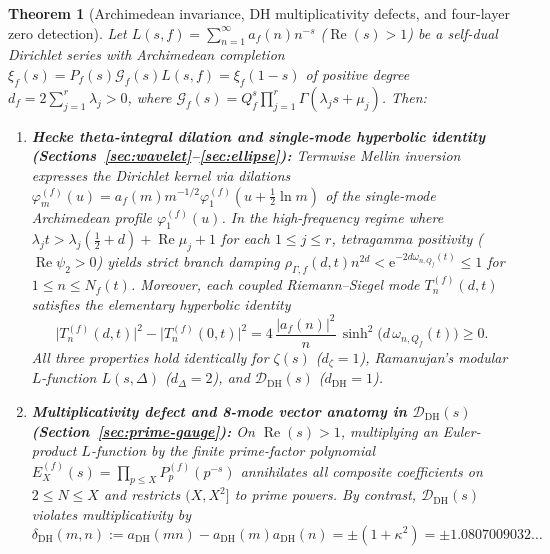 \documentclass[11pt,reqno]{amsart}
\newtheorem{theorem}{Theorem}[section]
\theoremstyle{definition}
\theoremstyle{remark}
\numberwithin{equation}{section}
\newcommand{\ee}{\mathrm{e}}
\DeclareMathOperator{\Reop}{Re}
\begin{document}
\begin{theorem}[Archimedean invariance, DH multiplicativity defects, and four-layer zero detection]
\label{thm:main-summary}
Let $L(s,f) = \sum_{n=1}^{\infty} a_f(n)n^{-s}$ ($\Reop(s) > 1$) be a self-dual Dirichlet series with Archimedean completion $\xi_f(s) = P_f(s)\mathcal{G}_f(s)L(s,f) = \xi_f(1-s)$ of positive degree $d_f = 2\sum_{j=1}^{r}\lambda_j > 0$, where $\mathcal{G}_f(s) = Q_f^s \prod_{j=1}^{r}\Gamma(\lambda_j s + \mu_j)$. Then:
\begin{enumerate}[label=\textup{(\roman*)},leftmargin=2.3em]
  \item \textbf{Hecke theta-integral dilation and single-mode hyperbolic identity (Sections~\ref{sec:wavelet}--\ref{sec:ellipse}):} Termwise Mellin inversion \cite{hecke1936} expresses the Dirichlet kernel via dilations $\varphi_m^{(f)}(u) = a_f(m)m^{-1/2}\varphi_1^{(f)}(u + \frac{1}{2}\ln m)$ of the single-mode Archimedean profile $\varphi_1^{(f)}(u)$. In the high-frequency regime where $\lambda_j t > \lambda_j(\frac{1}{2}+d)+\Reop\mu_j + 1$ for each $1\le j\le r$, tetragamma positivity ($\Reop\psi_2 > 0$) yields strict branch damping $\rho_{\Gamma,f}(d,t)n^{2d} < \ee^{-2d\omega_{n,Q_f}(t)} \le 1$ for $1 \le n \le N_f(t)$. Moreover, each coupled Riemann--Siegel mode $T_n^{(f)}(d,t)$ satisfies the elementary hyperbolic identity
  \begin{equation}
    \bigl|T_n^{(f)}(d,t)\bigr|^2 - \bigl|T_n^{(f)}(0,t)\bigr|^2
    = 4\,\frac{|a_f(n)|^2}{n}\,\sinh^2\bigl(d\,\omega_{n,Q_f}(t)\bigr) \ge 0.
    \label{eq:intro-ellipse}
  \end{equation}
  All three properties hold identically for $\zeta(s)$ ($d_\zeta = 1$), Ramanujan's modular $L$-function $L(s,\Delta)$ ($d_\Delta = 2$), and $\mathcal{D}_{\mathrm{DH}}(s)$ ($d_{\mathrm{DH}} = 1$).
  \item \textbf{Multiplicativity defect and 8-mode vector anatomy in $\mathcal{D}_{\mathrm{DH}}(s)$ (Section~\ref{sec:prime-gauge}):} On $\Reop(s) > 1$, multiplying an Euler-product $L$-function by the finite prime-factor polynomial $E_X^{(f)}(s) = \prod_{p\le X}P_p^{(f)}(p^{-s})$ \cite{gonek2007} annihilates all composite coefficients on $2\le N\le X$ and restricts $(X,X^2]$ to prime powers. By contrast, $\mathcal{D}_{\mathrm{DH}}(s)$ violates multiplicativity by
  \begin{equation}
    \delta_{\mathrm{DH}}(m,n) := a_{\mathrm{DH}}(mn) - a_{\mathrm{DH}}(m)a_{\mathrm{DH}}(n) = \pm(1 + \kappa^2) = \pm 1.0807009032\ldots
    \label{eq:intro-defect}
  \end{equation}

\end{enumerate}
\end{theorem}
\end{document}
